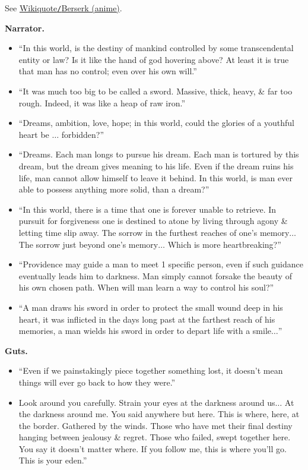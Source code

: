 \documentclass{article}
\numberwithin{equation}{section}
\begin{document}
\begin{enumerate}
    See \href{https://en.wikiquote.org/wiki/Berserk_(anime)}{Wikiquote\texttt{/}Berserk (anime)}.
    
    \textbf{Narrator.}
   	\begin{itemize}
   		\item ``In this world, is the destiny of mankind controlled by some transcendental entity or law? Is it like the hand of god hovering above? At least it is true that man has no control; even over his own will.''
   		\item ``It was much too big to be called a sword. Massive, thick, heavy, \& far too rough. Indeed, it was like a heap of raw iron.''
   		\item ``Dreams, ambition, love, hope; in this world, could the glories of a youthful heart be $\ldots$ forbidden?''
   		\item ``Dreams. Each man longs to pursue his dream. Each man is tortured by this dream, but the dream gives meaning to his life. Even if the dream ruins his life, man cannot allow himself to leave it behind. In this world, is man ever able to possess anything more solid, than a dream?''
   		\item ``In this world, there is a time that one is forever unable to retrieve. In pursuit for forgiveness one is destined to atone by living through agony \& letting time slip away. The sorrow in the furthest reaches of one's memory$\ldots$ The sorrow just beyond one's memory$\ldots$ Which is more heartbreaking?''
   		\item ``Providence may guide a man to meet 1 specific person, even if such guidance eventually leads him to darkness. Man simply cannot forsake the beauty of his own chosen path. When will man learn a way to control his soul?''
   		\item ``A man draws his sword in order to protect the small wound deep in his heart, it was inflicted in the days long past at the farthest reach of his memories, a man wields his sword in order to depart life with a smile$\ldots$''
   	\end{itemize}
    \textbf{Guts.}
    \begin{itemize}
    	\item ``Even if we painstakingly piece together something lost, it doesn't mean things will ever go back to how they were.''
    	\item Look around you carefully. Strain your eyes at the darkness around us$\ldots$ At the darkness around me. You said anywhere but here. This is where, here, at the border. Gathered by the winds. Those who have met their final destiny hanging between jealousy \& regret. Those who failed, swept together here. You say it doesn't matter where. If you follow me, this is where you'll go. This is your eden.''

\end{itemize}
\end{enumerate}
\end{document}
